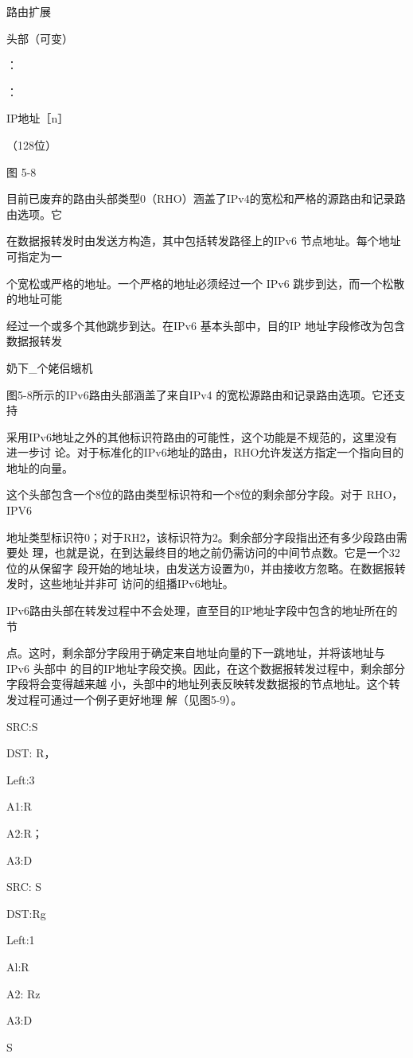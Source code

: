 路由扩展

头部（可变）

：

：

IP地址［n］

（128位）

图 5-8

目前已废弃的路由头部类型0（RHO）涵盖了IPv4的宽松和严格的源路由和记录路由选项。它

在数据报转发时由发送方构造，其中包括转发路径上的IPv6 节点地址。每个地址可指定为一

个宽松或严格的地址。一个严格的地址必须经过一个 IPv6 跳步到达，而一个松散的地址可能

经过一个或多个其他跳步到达。在IPv6 基本头部中，目的IP 地址字段修改为包含数据报转发

奶下\_个姥侣蛾机

图5-8所示的IPv6路由头部涵盖了来自IPv4 的宽松源路由和记录路由选项。它还支持

采用IPv6地址之外的其他标识符路由的可能性，这个功能是不规范的，这里没有进一步讨
论。对于标准化的IPv6地址的路由，RHO允许发送方指定一个指向目的地址的向量。

这个头部包含一个8位的路由类型标识符和一个8位的剩余部分字段。对于 RHO，IPV6

地址类型标识符0；对于RH2，该标识符为2。剩余部分字段指出还有多少段路由需要处
理，也就是说，在到达最终目的地之前仍需访问的中间节点数。它是一个32位的从保留字
段开始的地址块，由发送方设置为0，并由接收方忽略。在数据报转发时，这些地址并非可
访问的组播IPv6地址。

IPv6路由头部在转发过程中不会处理，直至目的IP地址字段中包含的地址所在的节

点。这时，剩余部分字段用于确定来自地址向量的下一跳地址，并将该地址与IPv6 头部中
的目的IP地址字段交换。因此，在这个数据报转发过程中，剩余部分字段将会变得越来越
小，头部中的地址列表反映转发数据报的节点地址。这个转发过程可通过一个例子更好地理
解（见图5-9）。

SRC:S

DST: R，

Left:3

A1:R

A2:R；

A3:D

SRC: S

DST:Rg

Left:1

Al:R

A2: Rz

A3:D

S

